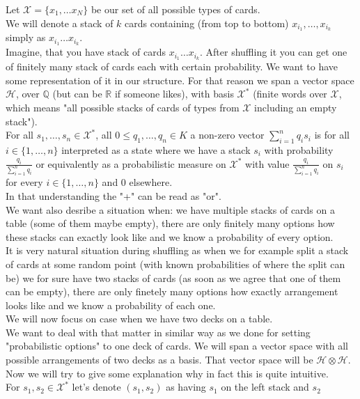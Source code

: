 \documentclass[a4paper]{article}
\begin{document}
Let $\mathcal{X} = \{x_1, \dots x_N\}$ be our set of all possible types of cards. \\
We will denote a stack of $k$ cards containing (from top to bottom) $x_{i_1}, \dots, x_{i_k}$ simply as
$x_{i_1}\dots x_{i_k}$. \\
Imagine, that you have stack of cards $x_{i_1}\dots x_{i_k}$. After shuffling it
you can get one of finitely many stack of cards each with certain probability. We want to have some
representation of it in our structure.
For that reason we span a vector space $\mathcal{H}$, over $\mathbb{Q}$ (but can be $\mathbb{R}$ if someone
likes),
with basis $\mathcal{X}^*$ (finite words over $\mathcal{X}$, which means "all possible stacks
of cards of types from $\mathcal{X}$ including an empty stack"). \\
For all $s_1, \dots, s_n \in \mathcal{X}^*$, all $0 \leq q_1, \dots, q_n \in K$ a non-zero vector
$\displaystyle\sum^{n}_{i = 1} q_is_i$ is for all $i \in \{1, \dots, n\}$
interpreted as a state where we have a stack $s_i$ with probability $\frac{q_i}{\sum^n_{i=1} q_i}$ or
equivalently as a probabilistic measure on $\mathcal{X}^*$ with value $\frac{q_i}{\sum^n_{i=1} q_i}$ on $s_i$
for every $i \in \{1, \dots, n\}$ and $0$ elsewhere. \\
In that understanding the "+" can be read as "or". \\
We want also desribe a situation when: we have multiple stacks of cards on a table (some of them maybe
empty), there are only finitely many options how
these stacks can exactly look like and we know a probability of every option.\\
It is very natural situation during shuffling as when we for example split a stack of cards at some
random point (with known probabilities of where the split can be)
we for sure have two stacks of cards (as soon as we agree that one of them can be empty),
there are only finetely many options how exactly arrangement looks like and we know a probability of each
one.
\\ We will now focus on case when we have two decks on a table. \\
We want to deal with that matter in similar way as we done for setting "probabilistic options" to one deck
of cards. We will span a vector space with all possible arrangements of two decks as a basis.
That vector space will be $\mathcal{H} \otimes \mathcal{H}$. Now we will try to give some explanation why in
fact this is quite intuitive.  \\
For $s_1, s_2 \in \mathcal{X}^*$ let's denote $(s_1, s_2)$ as having $s_1$ on the left stack and $s_2$
\end{document}
